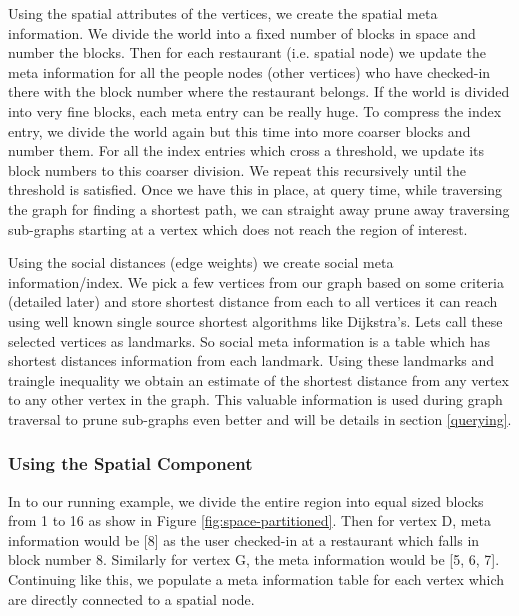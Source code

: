 Using the spatial attributes of the vertices, we create the spatial meta information. We divide the world into a fixed number of blocks in space and number the blocks. Then for each restaurant (i.e. spatial node) we update the meta information for all the people nodes (other vertices) who have checked-in there with the block number where the restaurant belongs. If the world is divided into very fine blocks, each meta entry can be really huge. To compress the index entry, we divide the world again but this time into more coarser blocks and number them. For all the index entries which cross a threshold, we update its block numbers to this coarser division. We repeat this recursively until the threshold is satisfied. Once we have this in place, at query time, while traversing the graph for finding a shortest path, we can straight away prune away traversing sub-graphs starting at a vertex which does not reach the region of interest.

Using the social distances (edge weights) we create social meta information/index. We pick a few vertices from our graph based on some criteria (detailed later) and store shortest distance from each to all vertices it can reach using well known single source shortest algorithms like Dijkstra's. Lets call these selected vertices as landmarks. So social meta information is a table which has shortest distances information from each landmark. Using these landmarks and traingle inequality we obtain an estimate of the shortest distance from any vertex to any other vertex in the graph. This valuable information is used during graph traversal to prune sub-graphs even better and will be details in section \ref{querying}.

\subsubsection{Using the Spatial Component}
In to our running example, we divide the entire region into equal sized blocks from 1 to 16 as show in Figure \ref{fig:space-partitioned}. Then for vertex D, meta information would be {[}8{]} as the user checked-in at a restaurant which falls in block number 8. Similarly for vertex G, the meta information would be {[}5, 6, 7{]}. Continuing like this, we populate a meta information table for each vertex which are directly connected to a spatial node.


